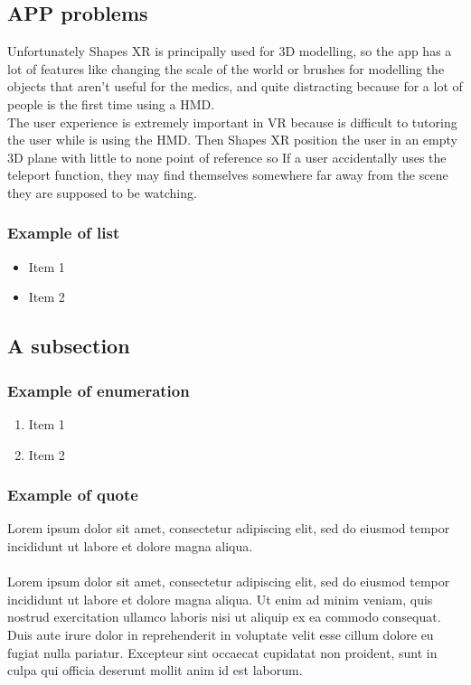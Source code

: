 \subsection{APP problems}

Unfortunately Shapes XR is principally used for 3D modelling, so the app has a lot of features like changing the scale of the world or brushes for modelling the objects that aren't useful for the medics,
and quite distracting because for a lot of people is the first time using a \ac{HMD}.\\
The user experience is extremely important in \ac{VR} because is difficult to tutoring the user while is using the \ac{HMD}.
Then Shapes XR position the user in an empty 3D plane with little to none point of reference so If a user accidentally uses the teleport function, they may find themselves somewhere far away from the scene they are supposed to be watching.

\subsubsection{Example of list}
\begin{itemize}
  \item Item 1
  \item Item 2
\end{itemize}

\subsection{A subsection}


\subsubsection{Example of enumeration}
\begin{enumerate}
  \item Item 1
  \item Item 2
\end{enumerate}

\subsubsection{Example of quote}
\begin{displayquote}
Lorem ipsum dolor sit amet, consectetur adipiscing elit, sed do eiusmod tempor incididunt ut labore et dolore magna aliqua.
\end{displayquote}

\paragraph{}
Lorem ipsum dolor sit amet, consectetur adipiscing elit, sed do eiusmod tempor incididunt ut labore et dolore magna aliqua. Ut enim ad minim veniam, quis nostrud exercitation ullamco laboris nisi ut aliquip ex ea commodo consequat. Duis aute irure dolor in reprehenderit in voluptate velit esse cillum dolore eu fugiat nulla pariatur. Excepteur sint occaecat cupidatat non proident, sunt in culpa qui officia deserunt mollit anim id est laborum.